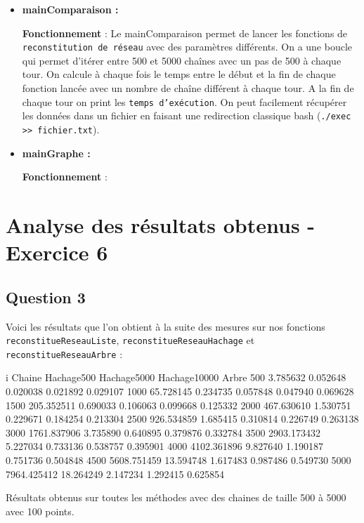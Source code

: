 \documentclass[12pt]{extarticle}
\begin{document}
\begin{itemize}[label=-]
    \item \textbf{mainComparaison :} \\
    \textbf{Fonctionnement} : Le mainComparaison permet de lancer les fonctions de \texttt{reconstitution de réseau} avec des paramètres différents. On a une boucle qui permet d'itérer entre 500 et 5000 chaînes avec un pas de 500 à chaque tour. On calcule à chaque fois le temps entre le début et la fin de chaque fonction lancée avec un nombre de chaîne différent à chaque tour. A la fin de chaque tour on print les \texttt{temps d'exécution}. On peut facilement récupérer les données dans un fichier en faisant une redirection classique bash (\lstinline{./exec >> fichier.txt}).
    \\

    \item \textbf{mainGraphe :} \\
    \textbf{Fonctionnement} :
    
    
    

    
\end{itemize}


\newpage
\section*{Analyse des résultats obtenus - Exercice 6}
\subsection*{Question 3}
Voici les résultats que l'on obtient à la suite des mesures sur nos fonctions \\
\texttt{reconstitueReseauListe}, \texttt{reconstitueReseauHachage} et \texttt{reconstitueReseauArbre} :
\begin{bashcode}
i     Chaine	    Hachage500	 Hachage5000  Hachage10000   Arbre
500   3.785632      0.052648     0.020038     0.021892	    0.029107
1000  65.728145     0.234735     0.057848     0.047940      0.069628
1500  205.352511    0.690033     0.106063     0.099668      0.125332
2000  467.630610    1.530751     0.229671     0.184254      0.213304
2500  926.534859    1.685415     0.310814     0.226749      0.263138
3000  1761.837906   3.735890     0.640895     0.379876      0.332784
3500  2903.173432   5.227034     0.733136     0.538757      0.395901
4000  4102.361896   9.827640     1.190187     0.751736      0.504848
4500  5608.751459   13.594748    1.617483     0.987486      0.549730
5000  7964.425412   18.264249    2.147234     1.292415      0.625854
\end{bashcode} 
{\small Résultats obtenus sur toutes les méthodes avec des chaines de taille 500 à 5000 avec 100 points.} \\ \\
\end{document}

